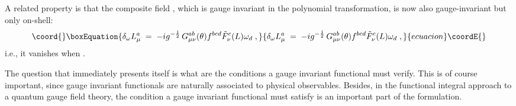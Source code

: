 \documentclass[a4paper,12pt]{article}
\begin{document}
A related property is that the composite field \coordHE{}, which is gauge invariant 
in the polynomial transformation, is now also gauge-invariant but only on-shell:
\begin{equation}\coord{}\boxEquation{\label{eq:delf}
\delta_\omega L_\mu^a \;=\; - i g^{-\frac{1}{2}} \, G_{\mu\nu}^{ab}(\theta) 
f^{bcd} {\tilde F}_\nu^c (L) \omega_d  \;,
}{\delta_\omega L_\mu^a \;=\; - i g^{-\frac{1}{2}} \, G_{\mu\nu}^{ab}(\theta) 
f^{bcd} {\tilde F}_\nu^c (L) \omega_d  \;,
}{ecuacion}\coordE{}\end{equation}
i.e., it vanishes when \coordHE{}.

The question that immediately presents itself is what are the
conditions a gauge invariant functional must verify. This is of course
important, since gauge invariant functionals are naturally associated
to physical observables. Besides, in the functional integral approach
to a quantum gauge field theory, the condition a gauge invariant
functional must satisfy is an important part of the formulation.
\end{document}
